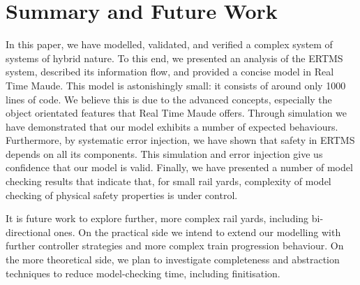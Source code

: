 \section{Summary and Future Work}

In this paper, we have modelled, validated, and verified a complex
system of systems of hybrid nature.
%
%
%
To this end, 
%
we presented an analysis of the ERTMS system,
%
described its information flow,
%
and provided a concise model in Real Time Maude. 
%
This model is astonishingly small: it consists of around only 1000
lines of code. We believe this is due to the advanced concepts,
especially the object orientated features that Real Time Maude offers.
%
Through simulation we have demonstrated that our model exhibits a
number of expected behaviours.
%
Furthermore, by systematic error injection, we have shown that safety
in ERTMS depends on all its components. 
%
This simulation and error injection give us confidence that our model
is valid.
%
Finally, we have presented a number of model checking results that
indicate that, for small rail yards, complexity of model checking of
physical safety properties is under control.

It is future work to explore further, more complex rail yards,
including bi-directional ones. On the practical side we intend to
extend our modelling with further controller strategies and more
complex train progression behaviour. On the more theoretical side, we
plan to investigate completeness and abstraction techniques to reduce
model-checking time, including finitisation.
